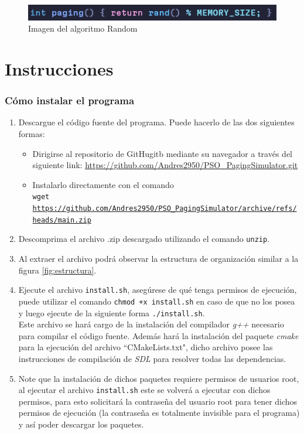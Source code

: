 \documentclass{report}
\begin{document}
\begin{figure}[h]
	\centering
	\includegraphics[width=0.8\linewidth]{figuras/random.png}
	\caption{Imagen del algoritmo Random }
	\label{fig:random}
\end{figure}



\section{Instrucciones}
\subsubsection{Cómo instalar el programa}
\begin{enumerate}
  \item Descargue el código fuente del programa. Puede hacerlo de las dos siguientes formas:
    \begin{itemize}
      \item Dirigirse al repositorio de GitHugitb mediante su navegador a través del siguiente link: \url{https://github.com/Andres2950/PSO\_PagingSimulator.git}
      \item Instalarlo directamente con el comando \\
    \texttt{wget \url{https://github.com/Andres2950/PSO\_PagingSimulator/archive/refs/heads/main.zip}}
    \end{itemize}
  \item Descomprima el archivo .zip descargado utilizando el comando \texttt{unzip}.
  \item Al extraer el archivo podrá observar la estructura de organización similar a la figura \ref{fig:estructura}.
\item Ejecute el archivo \texttt{install.sh}, asegúrese de qué tenga permisos de ejecución, puede utilizar el comando \texttt{chmod +x install.sh} en caso de que no los posea y luego ejecute de la siguiente forma \texttt{./install.sh}. \\
  Este archivo se hará cargo de la instalación del compilador \textit{g++} necesario para compilar el código fuente. Además hará la instalación del paquete \textit{cmake} para la ejecución del archivo ``CMakeLists.txt", dicho archivo posee las instrucciones de compilación de \textit{SDL} para resolver todas las dependencias. 
\item Note que la instalación de dichos paquetes requiere permisos de usuarios root, al ejecutar el archivo \texttt{install.sh} este se volverá a ejecutar con dichos permisos, para esto solicitará la contraseña del usuario root para tener dichos permisos de ejecución (la contraseña es totalmente invisible para el programa) y así poder descargar los paquetes.

\end{enumerate}
\end{document}
